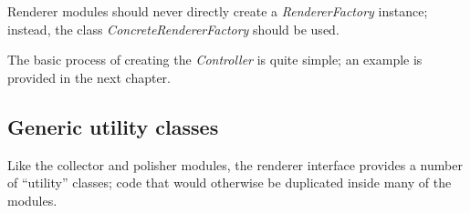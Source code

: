 Renderer modules should never directly create a \emph{RendererFactory} instance; instead, the class
\emph{ConcreteRendererFactory} should be used.


The basic process of creating the \emph{Controller} is quite simple; an example is provided in the next chapter.

%


\subsection{Generic utility classes}
Like the collector and polisher modules, the renderer interface provides a number of ``utility'' classes; code that
would otherwise be duplicated inside many of the modules.

